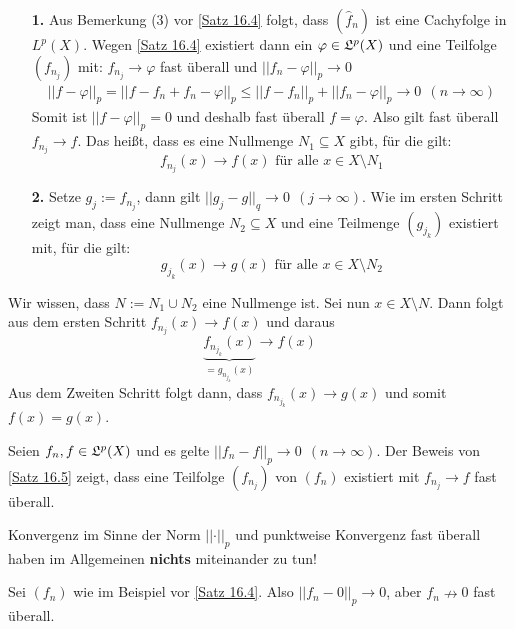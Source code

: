 \documentclass[a4paper,twoside,DIV15,BCOR12mm,chapterprefix=true,headings=onelinechapter]{scrbook}
\begin{document}
\begin{beweis}
\begin{enumerate}
\item[\textbf{1.}]
	Aus Bemerkung (3) vor \ref{Satz 16.4} folgt, dass \((\hat f_n)\) ist eine Cachyfolge in
	\(L^p(X)\). Wegen \ref{Satz 16.4} existiert dann ein \(\varphi\in\mathfrak{L}^p(X)\) und eine Teilfolge
	\((f_{n_j})\) mit: \(f_{n_j}\to\varphi\) fast überall und 
	\(\lvert\lvert f_n-\varphi\rvert\rvert_p\to0\)
	\begin{align*}
		\lvert\lvert f-\varphi\rvert\rvert_p
		= \lvert\lvert f-f_n+f_n-\varphi\rvert\rvert_p
		\leq \lvert\lvert f-f_n\rvert\rvert_p + \lvert\lvert f_n-\varphi\rvert\rvert_p
		\to 0\ \ (n\to\infty)
	\end{align*}
	Somit ist \(\lvert\lvert f-\varphi\rvert\rvert_p=0\) und deshalb fast überall \(f=\varphi\).
	Also gilt fast überall \(f_{n_j}\to f\). Das heißt, dass es eine Nullmenge \(N_1\subseteq X\) gibt,
	für die gilt: \[f_{n_j}(x)\to f(x) \text{ für alle } x\in X\setminus N_1\]
\item[\textbf{2.}]
	Setze \(g_j:=f_{n_j}\), dann gilt \(\lvert\lvert g_j-g\rvert\rvert_q\to0\ \ (j\to\infty)\). Wie
	im ersten Schritt zeigt man, dass eine Nullmenge \(N_2\subseteq X\) und eine Teilmenge
	\((g_{j_k})\) existiert mit, für die gilt:
	\[g_{j_k}(x)\to g(x) \text{ für alle } x\in X\setminus N_2\]
\end{enumerate}
Wir wissen, dass \(N:=N_1\cup N_2\) eine Nullmenge ist. Sei nun \(x\in X\setminus N\). Dann
folgt aus dem ersten Schritt \(f_{n_j}(x)\to f(x)\) und daraus 
\[ \underbrace{f_{n_{j_k}}(x)}_{=g_{n_{j_k}}(x)}\to f(x) \]
Aus dem Zweiten Schritt folgt dann, dass \(f_{n_{j_k}}(x)\to g(x)\) und somit \(f(x)=g(x)\).
\end{beweis}

\begin{bemerkung}
Seien \(f_n,f\in\mathfrak{L}^p(X)\) und es gelte \(\lvert\lvert f_n-f\rvert\rvert_p\to 0\ \ (n\to\infty)\). Der
Beweis von \ref{Satz 16.5} zeigt, dass eine Teilfolge \((f_{n_j})\) von \((f_n)\) existiert mit 
\(f_{n_j}\to f\) fast überall.
\end{bemerkung}

\begin{bemerkung}
Konvergenz im Sinne der Norm \(\lvert\lvert\cdot\rvert\rvert_p\) und punktweise Konvergenz fast
überall haben im Allgemeinen \textbf{nichts} miteinander zu tun!
\end{bemerkung}

\begin{beispiel}
Sei \((f_n)\) wie im Beispiel vor \ref{Satz 16.4}. Also \(\lvert\lvert f_n-0\rvert\rvert_p\to 0\), aber
\(f_n\nrightarrow 0\) fast überall.
\end{beispiel}
\end{document}
